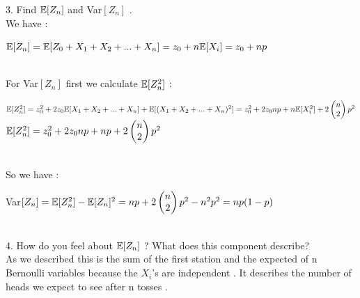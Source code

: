 \documentclass[30pt]{article}
\begin{document}
{\color{blue} {\large 3. } Find $\Bbb{E}[Z_n] $ and Var$[Z_n] $ . } \\ \newline
We have : \\
\begin{center}
    $\Bbb{E}[Z_n] = \Bbb{E}[Z_0 + X_1 + X_2 + ... + X_n] = z_0 + n\Bbb{E}[X_i] = z_0 + np  $
\end{center} \\
For Var$[Z_n] $ first we calculate $\Bbb{E}[Z_n^2] $ : \\
\begin{center}
    $\Bbb{E}[Z_n^2] = z_0^2 + 2z_0 \Bbb{E}[X_1 + X_2 + ... + X_n] + \Bbb{E}[(X_1 + X_2 + ... + X_n)^2] = z_0^2 + 2z_0 np + n\Bbb{E}[X_i^2] + 2\begin{pmatrix}n \\ 2 \end{pmatrix} p^2  $ \vspace{0.2cm} \\
    $\Bbb{E}[Z_n^2] = z_0^2 + 2z_0 np + np + 2\begin{pmatrix}n \\ 2 \end{pmatrix} p^2 $
\end{center} \\
So we have : \\
\begin{center}
    Var$[Z_n] = \Bbb{E}[Z_n^2] - \Bbb{E}[Z_n]^2 = np + 2\begin{pmatrix}n \\ 2 \end{pmatrix} p^2 - n^2p^2 =  np(1 - p) $ 
\end{center} \\ \newline 
{\color{blue} {\large 4. } How do you feel about $\Bbb{E}[Z_n] $ ? What does this component describe? } \\ \newline 
As we described this is the sum of the first station and the expected of n Bernoulli variables because the $X_i$'s are independent . It describes the number of heads we expect to see after n tosses . \\
\end{document}
